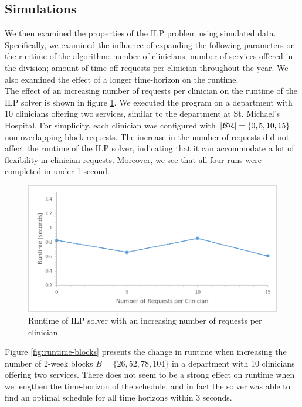 

\subsection{Simulations}
We then examined the properties of the ILP problem using simulated data. Specifically, we examined the influence of expanding the following parameters on the runtime of the algorithm: number of clinicians; number of services offered in the division; amount of time-off requests per clinician throughout the year. We also examined the effect of a longer time-horizon on the runtime. \\

The effect of an increasing number of requests per clinician on the runtime of the ILP solver is shown in figure \ref{fig:runtime-requests}. We executed the program on a department with 10 clinicians offering two services, similar to the department at St. Michael's Hospital. For simplicity, each clinician was configured with $\abs{\mathcal{BR}} = \{0, 5, 10, 15\}$ non-overlapping block requests. The increase in the number of requests did not affect the runtime of the ILP solver, indicating that it can accommodate a lot of flexibility in clinician requests. Moreover, we see that all four runs were completed in under 1 second. \\

\begin{figure}[h]
	\centering
	\includegraphics[scale=.5]{fig/runtime_requests}
	\caption{Runtime of ILP solver with an increasing number of requests per clinician}
	\label{fig:runtime-requests}
\end{figure}

Figure \ref{fig:runtime-blocks} presents the change in runtime when increasing the number of 2-week blocks $B = \{26, 52, 78, 104\}$ in a department with 10 clinicians offering two services. There does not seem to be a strong effect on runtime when we lengthen the time-horizon of the schedule, and in fact the solver was able to find an optimal schedule for all time horizons within 3 seconds. \\ %

